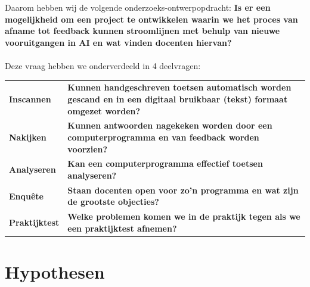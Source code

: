 \documentclass[12pt]{article}
\begin{document}
\begin{multicols}{2}
Daarom hebben wij de volgende onderzoeks-ontwerpopdracht: %
\textbf{Is er een mogelijkheid om een project te ontwikkelen waarin we het proces van afname tot feedback kunnen stroomlijnen met behulp van nieuwe vooruitgangen in AI en wat vinden docenten hiervan?}
\\\\
Deze vraag hebben we onderverdeeld in 4 deelvragen:\\
\begin{tabularx}{\linewidth}{lX}
    \vspace{0.2cm}
   \textbf{Inscannen } & \textbf{Kunnen handgeschreven toetsen automatisch worden gescand en in een digitaal bruikbaar (tekst) formaat omgezet worden?} \\
   \vspace{0.2cm}
   \textbf{Nakijken } & \textbf{Kunnen antwoorden nagekeken worden door een computerprogramma en van feedback worden voorzien?} \\
   \vspace{0.2cm}
   \textbf{Analyseren } & \textbf{Kan een computerprogramma effectief toetsen analyseren?} \\
   \vspace{0.2cm}
   \textbf{Enquête } & \textbf{Staan docenten open voor zo'n programma en wat zijn de grootste objecties? } \\
   \vspace{0.2cm}
   \textbf{Praktijktest } & \textbf{Welke problemen komen we in de praktijk tegen als we een praktijktest afnemen? } \\
\end{tabularx}

\end{multicols}
\pagebreak


\section{Hypothesen}
\end{document}
